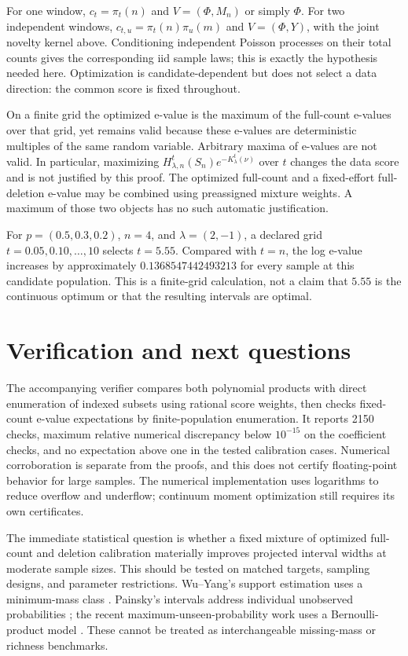 \documentclass[11pt]{article}
\theoremstyle{remark}\newtheorem{remark}[theorem]{Remark}
\begin{document}
For one window, $c_t=\pi_t(n)$ and $V=(\Phi,M_n)$ or simply $\Phi$.
For two independent windows, $c_{t,u}=\pi_t(n)\pi_u(m)$ and
$V=(\Phi,Y)$, with the joint novelty kernel above.
Conditioning independent Poisson processes on their total counts gives the
corresponding iid sample laws; this is exactly the hypothesis needed here.
Optimization is candidate-dependent but does not select a data direction:
the common score is fixed throughout.

On a finite grid the optimized e-value is the maximum of the
full-count e-values over that grid, yet remains valid because these e-values
are deterministic multiples of the same random variable.
Arbitrary maxima of e-values are not valid.
In particular, maximizing $H_{\lambda,n}^t(S_n)e^{-K_\lambda^t(\nu)}$
over $t$ changes the data score and is not justified by this proof.
The optimized full-count and a fixed-effort full-deletion e-value may be
combined using preassigned mixture weights. A maximum of those two objects
has no such automatic justification.

For $p=(0.5,0.3,0.2)$, $n=4$, and $\lambda=(2,-1)$, a declared grid
$t=0.05,0.10,\ldots,10$ selects $t=5.55$. Compared with $t=n$,
the log e-value increases by approximately $0.1368547442493213$ for every
sample at this candidate population. This is a finite-grid calculation,
not a claim that $5.55$ is the continuous optimum or that the resulting
intervals are optimal.

\section{Verification and next questions}
The accompanying verifier compares both polynomial products with direct
enumeration of indexed subsets using rational score weights, then checks
fixed-count e-value expectations by finite-population enumeration.
It reports 2150 checks, maximum relative numerical discrepancy below
$10^{-15}$ on the coefficient checks, and no expectation above one in the
tested calibration cases. Numerical corroboration is separate from the
proofs, and this does not certify floating-point behavior for large samples.
The numerical implementation uses logarithms to reduce overflow and
underflow; continuum moment optimization still requires its own certificates.

The immediate statistical question is whether a fixed mixture of optimized
full-count and deletion calibration materially improves projected interval
widths at moderate sample sizes. This should be tested on matched targets,
sampling designs, and parameter restrictions. Wu--Yang's support estimation
uses a minimum-mass class \cite{WuYang}. Painsky's intervals address individual
unobserved probabilities \cite{Painsky}; the recent maximum-unseen-probability
work uses a Bernoulli-product model \cite{Colombi}. These cannot be treated as
interchangeable missing-mass or richness benchmarks.
\end{document}
